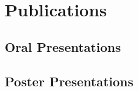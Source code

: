 \documentclass[10pt, letterpaper]{article}
\newcommand{\LastName}{Mishra}
\newcommand{\Initials}{PK}
\newcommand{\Me}{\textbf{\LastName, \Initials}}  %
\newcommand{\DOI}[1]{doi:\href{https://doi.org/#1}{#1}}
\newcommand{\GitHub}[1]{\href{https://github.com/#1}{\faGithub}}
\newcommand{\SlidesDOI}[1]{\href{https://doi.org/#1}{\faTv}}
\newcommand{\Year}[1]{\fontsize{9pt}{0}\selectfont #1}
\begin{document}
\section{Publications}
\cite{*}

\subsection{Oral Presentations}
\printbibliography[keyword={Oral-Presentation}]

\subsection{Poster Presentations}
\printbibliography[keyword={Poster-Presentation}]





\end{document}

